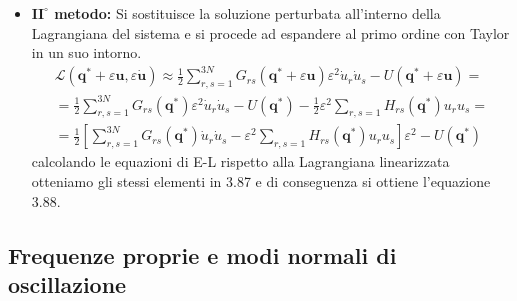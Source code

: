 \begin{itemize}
\item \textbf{$\bm{II}^{\circ}$ metodo:} Si sostituisce la soluzione perturbata all'interno della Lagrangiana del sistema e si procede ad espandere al primo ordine con Taylor in un suo intorno.
\begin{equation}
\begin{aligned}
&\mathcal{L}(\bm{q}^{*}+\varepsilon\bm{u},\varepsilon\bm{\dot{u}}) \approx \frac{1}{2} \sum_{r,s=1}^{3N} G_{rs}(\bm{q}^{*}+\varepsilon \bm{u})\varepsilon^2 \dot{u}_r \dot{u}_s - U(\bm{q}^{*}+ \varepsilon \bm{u}) = \\
& = \frac{1}{2} \sum_{r,s=1}^{3N} G_{rs}(\bm{q}^{*})\varepsilon^2 \dot{u}_r \dot{u}_s - U(\bm{q}^{*}) - \frac{1}{2} \varepsilon^2 \sum_{r,s = 1}H_{rs}(\bm{q}^{*})u_r u_s = & \\
& = \frac{1}{2} \left [\sum_{r,s=1}^{3N} G_{rs}(\bm{q}^{*}) \dot{u}_r \dot{u}_s  - \varepsilon^2 \sum_{r,s = 1}H_{rs}(\bm{q}^{*}) u_r u_s \right ]\varepsilon^2- U(\bm{q}^{*})
\end{aligned}
\end{equation}
calcolando le equazioni di E-L rispetto alla Lagrangiana linearizzata otteniamo gli stessi elementi in 3.87  e di conseguenza si ottiene l'equazione 3.88.
\end{itemize}

\subsection{Frequenze proprie e modi normali di oscillazione}

